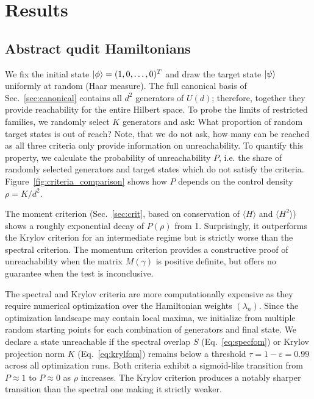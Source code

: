 \documentclass[aps,prx,reprint,superscriptaddress,footnote, twocolumn,notitlepage]{revtex4-2}
\begin{document}
\section{Results}\label{sec:results}

\subsection{Abstract qudit Hamiltonians}

We fix the initial state $\ket{\phi} = (1, 0, \ldots, 0)^T$ and draw the target state $\ket{\psi}$ uniformly at random (Haar measure). The full canonical basis of Sec.~\ref{sec:canonical} contains all $d^2$ generators of $U(d)$; therefore, together they provide reachability for the entire Hilbert space. To probe the limits of restricted families, we randomly select $K$ generators and ask: What proportion of random target states is out of reach? Note, that we do not ask, how many can be reached as all three criteria only provide information on unreachability. To quantify this property, we calculate the probability of unreachability $P$, i.e. the share of randomly selected generators and target states which do not satisfy the criteria. Figure~\ref{fig:criteria_comparison} shows how $P$ depends on the control density $\rho = K/d^2$. 


The moment criterion (Sec.~\ref{sec:crit}, based on conservation of $\langle H \rangle$ and $\langle H^2 \rangle$) shows a roughly exponential decay of $P(\rho)$ from 1. Surprisingly, it outperforms the Krylov criterion for an intermediate regime but is strictly worse than the spectral criterion. The momentum criterion provides a constructive proof of unreachability when the matrix $M(\gamma)$ is positive definite, but offers no guarantee when the test is inconclusive.

The spectral and Krylov criteria are more computationally expensive as they require numerical optimization over the Hamiltonian weights $(\lambda_n)$. Since the optimization landscape may contain local maxima, we initialize from multiple random starting points for each combination of generators and final state. We declare a state unreachable if the spectral overlap $S$ (Eq.~\eqref{eq:specfom}) or Krylov projection norm $K$ (Eq.~\eqref{eq:krylfom}) remains below a threshold $\tau =1-\varepsilon = 0.99$ across all optimization runs. Both criteria exhibit a sigmoid-like transition from $P \approx 1$ to $P \approx 0$ as $\rho$ increases. The Krylov criterion produces a notably sharper transition than the spectral one making it strictly weaker.
\end{document}
